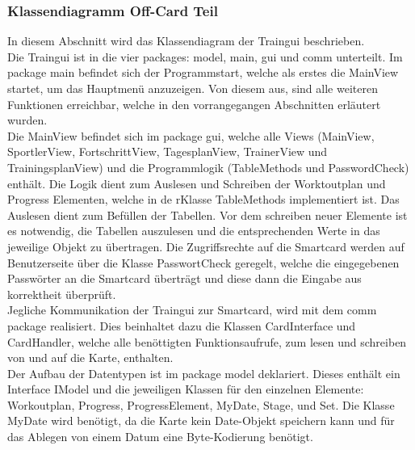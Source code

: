 \subsubsection*{Klassendiagramm Off-Card Teil}

In diesem Abschnitt wird das Klassendiagram der Traingui beschrieben.\\
\newline
Die Traingui ist in die vier packages: model, main, gui und comm unterteilt. Im package main befindet sich der Programmstart, welche als erstes die MainView startet, um das Hauptmenü anzuzeigen. Von diesem aus, sind alle weiteren Funktionen erreichbar, welche in den vorrangegangen Abschnitten erläutert wurden. \\
\newline
Die MainView befindet sich im package gui, welche alle Views (MainView, SportlerView, FortschrittView, TagesplanView, TrainerView und TrainingsplanView) und die Programmlogik (TableMethods und PasswordCheck) enthält. Die Logik dient zum Auslesen und Schreiben der Worktoutplan und Progress Elementen, welche in de rKlasse TableMethods implementiert ist. Das Auslesen dient zum Befüllen der Tabellen. Vor dem schreiben neuer Elemente ist es notwendig, die Tabellen auszulesen und die entsprechenden Werte in das jeweilige Objekt zu übertragen. Die Zugriffsrechte auf die Smartcard werden auf Benutzerseite über die Klasse PasswortCheck geregelt, welche die eingegebenen Passwörter an die Smartcard überträgt und diese dann die Eingabe aus korrektheit überprüft. \\
\newline
Jegliche Kommunikation der Traingui zur Smartcard, wird mit dem comm package realisiert. Dies beinhaltet dazu die Klassen CardInterface und CardHandler, welche alle benöttigten Funktionsaufrufe, zum lesen und schreiben von und auf die Karte, enthalten.\\
\newline
Der Aufbau der Datentypen ist im package model deklariert. Dieses enthält ein Interface IModel und die jeweiligen Klassen für den einzelnen Elemente: Workoutplan, Progress, ProgressElement, MyDate, Stage, und Set. Die Klasse MyDate wird benötigt, da die Karte kein Date-Objekt speichern kann und für das Ablegen von einem Datum eine Byte-Kodierung benötigt.


